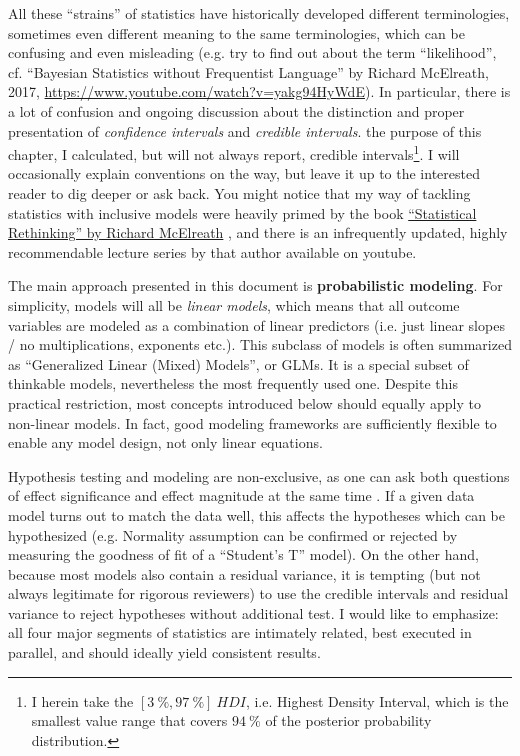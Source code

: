 All these ``strains'' of statistics have historically developed different terminologies, sometimes even different meaning to the same terminologies, which can be confusing and even misleading (e.g. try to find out about the term ``likelihood'', cf. ``Bayesian Statistics without Frequentist Language'' by Richard McElreath, 2017, \url{https://www.youtube.com/watch?v=yakg94HyWdE}).
In particular, there is a lot of confusion and ongoing discussion about the distinction and proper presentation of \emph{confidence intervals} and \emph{credible intervals}.
 the purpose of this chapter, I calculated, but will not always report, credible intervals\footnote{I herein take the $\left[3\ \%,97\ \%\right]\ HDI$, i.e. Highest Density Interval, which is the smallest value range that covers $94\ \%$ of the posterior probability distribution.}.
I will occasionally explain conventions on the way, but leave it up to the interested reader to dig deeper or ask back.
You might notice that my way of tackling statistics with inclusive models were heavily primed by the book \href{https://xcelab.net/rm/statistical-rethinking/}{``Statistical Rethinking'' by Richard McElreath} \citep{McElreath2018}, and there is an infrequently updated, highly recommendable lecture series by that author available on youtube.


The main approach presented in this document is \textbf{probabilistic modeling}.
For simplicity, models will all be \emph{linear models}, which means that all outcome variables are modeled as a combination of linear predictors (i.e. just linear slopes / no multiplications, exponents etc.).
This subclass of models is often summarized as ``Generalized Linear (Mixed) Models'', or GLMs.
It is a special subset of thinkable models, nevertheless the most frequently used one.
Despite this practical restriction, most concepts introduced below should equally apply to non-linear models.
In fact, good modeling frameworks are sufficiently flexible to enable any model design, not only linear equations.
\bigskip


Hypothesis testing and modeling are non-exclusive, as one can ask both questions of effect significance and effect magnitude at the same time .
If a given data model turns out to match the data well, this affects the hypotheses which can be hypothesized (e.g. Normality assumption can be confirmed or rejected by measuring the goodness of fit of a ``Student's T'' model).
On the other hand, because most models also contain a residual variance, it is tempting (but not always legitimate for rigorous reviewers) to use the credible intervals and residual variance to reject hypotheses without additional test.
I would like to emphasize: all four major segments of statistics are intimately related, best executed in parallel, and should ideally yield consistent results.

